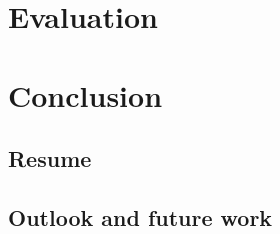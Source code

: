 \chapter{Evaluation}

\chapter{Conclusion}
\section{Resume}
\section{Outlook and future work}






